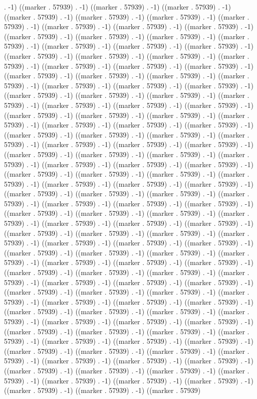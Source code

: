 . -1) ((marker . 57939) . -1) ((marker . 57939) . -1) ((marker . 57939) . -1) ((marker . 57939) . -1) ((marker . 57939) . -1) ((marker . 57939) . -1) ((marker . 57939) . -1) ((marker . 57939) . -1) ((marker . 57939) . -1) ((marker . 57939) . -1) ((marker . 57939) . -1) ((marker . 57939) . -1) ((marker . 57939) . -1) ((marker . 57939) . -1) ((marker . 57939) . -1) ((marker . 57939) . -1) ((marker . 57939) . -1) ((marker . 57939) . -1) ((marker . 57939) . -1) ((marker . 57939) . -1) ((marker . 57939) . -1) ((marker . 57939) . -1) ((marker . 57939) . -1) ((marker . 57939) . -1) ((marker . 57939) . -1) ((marker . 57939) . -1) ((marker . 57939) . -1) ((marker . 57939) . -1) ((marker . 57939) . -1) ((marker . 57939) . -1) ((marker . 57939) . -1) ((marker . 57939) . -1) ((marker . 57939) . -1) ((marker . 57939) . -1) ((marker . 57939) . -1) ((marker . 57939) . -1) ((marker . 57939) . -1) ((marker . 57939) . -1) ((marker . 57939) . -1) ((marker . 57939) . -1) ((marker . 57939) . -1) ((marker . 57939) . -1) ((marker . 57939) . -1) ((marker . 57939) . -1) ((marker . 57939) . -1) ((marker . 57939) . -1) ((marker . 57939) . -1) ((marker . 57939) . -1) ((marker . 57939) . -1) ((marker . 57939) . -1) ((marker . 57939) . -1) ((marker . 57939) . -1) ((marker . 57939) . -1) ((marker . 57939) . -1) ((marker . 57939) . -1) ((marker . 57939) . -1) ((marker . 57939) . -1) ((marker . 57939) . -1) ((marker . 57939) . -1) ((marker . 57939) . -1) ((marker . 57939) . -1) ((marker . 57939) . -1) ((marker . 57939) . -1) ((marker . 57939) . -1) ((marker . 57939) . -1) ((marker . 57939) . -1) ((marker . 57939) . -1) ((marker . 57939) . -1) ((marker . 57939) . -1) ((marker . 57939) . -1) ((marker . 57939) . -1) ((marker . 57939) . -1) ((marker . 57939) . -1) ((marker . 57939) . -1) ((marker . 57939) . -1) ((marker . 57939) . -1) ((marker . 57939) . -1) ((marker . 57939) . -1) ((marker . 57939) . -1) ((marker . 57939) . -1) ((marker . 57939) . -1) ((marker . 57939) . -1) ((marker . 57939) . -1) ((marker . 57939) . -1) ((marker . 57939) . -1) ((marker . 57939) . -1) ((marker . 57939) . -1) ((marker . 57939) . -1) ((marker . 57939) . -1) ((marker . 57939) . -1) ((marker . 57939) . -1) ((marker . 57939) . -1) ((marker . 57939) . -1) ((marker . 57939) . -1) ((marker . 57939) . -1) ((marker . 57939) . -1) ((marker . 57939) . -1) ((marker . 57939) . -1) ((marker . 57939) . -1) ((marker . 57939) . -1) ((marker . 57939) . -1) ((marker . 57939) . -1) ((marker . 57939) . -1) ((marker . 57939) . -1) ((marker . 57939) . -1) ((marker . 57939) . -1) ((marker . 57939) . -1) ((marker . 57939) . -1) ((marker . 57939) . -1) ((marker . 57939) . -1) ((marker . 57939) . -1) ((marker . 57939) . -1) ((marker . 57939) . -1) ((marker . 57939) . -1) ((marker . 57939) . -1) ((marker . 57939) . -1) ((marker . 57939) . -1) ((marker . 57939) . -1) ((marker . 57939) . -1) ((marker . 57939) . -1) ((marker . 57939) . -1) ((marker . 57939) . -1) ((marker . 57939) . -1) ((marker . 57939) . -1) ((marker . 57939) . -1) ((marker . 57939) . -1) ((marker . 57939) . -1) ((marker . 57939) . -1) ((marker . 57939) . -1) ((marker . 57939) . -1) ((marker . 57939) . -1) ((marker . 57939) . -1) ((marker . 57939) . -1) ((marker . 57939) . -1) ((marker . 57939) . -1) ((marker . 57939) . -1) ((marker . 57939) . -1) ((marker . 57939) . -1) ((marker . 57939) 